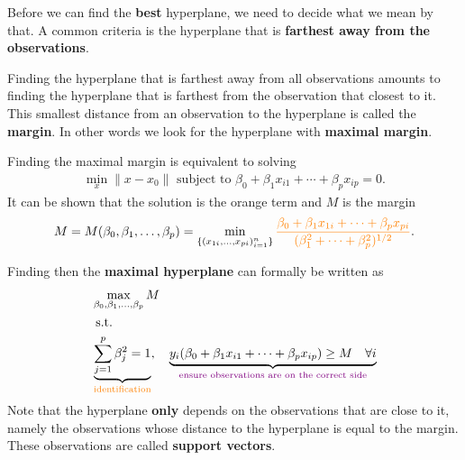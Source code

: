 \documentclass[aspectratio=169,10pt]{beamer}
\begin{document}
\begin{frame}{\secname}{\subsecname}
  Before we can find the \textbf{best} hyperplane, we need to decide what we mean by that.
  A common criteria is the hyperplane that is \textbf{farthest away from the observations}.

  Finding the hyperplane that is farthest away from all observations amounts to finding the hyperplane that is farthest from the observation that closest to it.
  This smallest distance from an observation to the hyperplane is called the \textbf{margin}.
  In other words we look for the hyperplane with \textbf{maximal margin}.

  Finding the maximal margin is equivalent to solving
  \begin{align}
    \min_x \| x - x_0 \| \text{ subject to } \beta_0 + \beta_1x_{i1} + \cdots + \beta_p x_{ip} = 0.
  \end{align}
  It can be shown that the solution is the {\color{orange} orange term} and $M$ is the margin
  \begin{align}
    M = M(\beta_0, \beta_1, \ldots, \beta_p)
    = \min_{\{ (x_{1i}, \ldots, x_{pi})^n_{i = 1}\}}{\color{orange}\frac{\beta_0 + \beta_1 x_{1i} + \cdots + \beta_px_{pi}}{(\beta_1^2 + \cdots + \beta_p^2)^{1/2}}}.
  \end{align}
\end{frame}

\begin{frame}{\secname}{\subsecname}
  Finding then the \textbf{maximal hyperplane} can formally be written as
  \begin{align}
    &\max_{\beta_0, \beta_1, \ldots, \beta_p} M \\
    &\text{ s.t.} \nonumber \\
    & \underbrace{\sum_{j=1}^p \beta_j^2 = 1}_{{\color{orange}\text{identification}}}, \quad \underbrace{y_i(\beta_0 + \beta_1x_{i1} + \cdots + \beta_px_{ip}) \geq M \quad \forall i}_{{\color{violet}\text{ensure observations are on the correct side}}}
  \end{align}
  Note that the hyperplane \textbf{only} depends on the observations that are close to it, namely the observations whose distance to the hyperplane is equal to the margin.
  These observations are called \textbf{support vectors}.
\end{frame}
\end{document}
